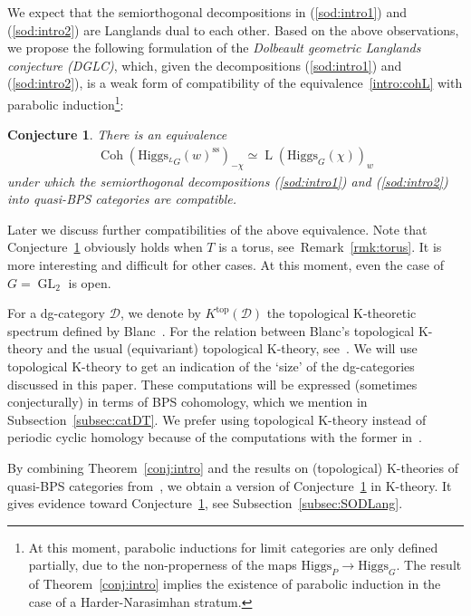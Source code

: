 \documentclass [11pt,oneside,a4paper,mathscr]{amsart}
\newtheorem{conj}[thm]{Conjecture}
\theoremstyle{definition}
\newcommand{\LL}{\operatorname{L}}
\newcommand{\Coh}{\operatorname{Coh}}
\newcommand{\GL}{\operatorname{GL}}
\newcommand{\Hig}{\mathrm{Higgs}}
\begin{document}
We expect that the semiorthogonal decompositions in (\ref{sod:intro1})
and (\ref{sod:intro2}) are Langlands dual to each other. 
Based on the above observations, we propose the following formulation of the \textit{Dolbeault geometric Langlands conjecture (DGLC)}, which, given the decompositions (\ref{sod:intro1}) and (\ref{sod:intro2}), is a weak form of compatibility of the equivalence~\eqref{intro:cohL} with parabolic induction\footnote{At this moment, parabolic inductions for limit categories are only defined partially, due to the non-properness of the maps $\Hig_P \to \Hig_G$. The result of Theorem~\ref{conj:intro} implies the existence of parabolic induction in the case of a Harder-Narasimhan stratum.}: 
\begin{conj}\label{conj:Higgs}
There is an equivalence 
\begin{align}\label{intro:eq:CohL}
    \Coh(\Hig_{^{L}G}(w)^{\mathrm{ss}})_{-\chi} \simeq \LL(\Hig_{G}(\chi))_{w}
\end{align}
under which the semiorthogonal decompositions (\ref{sod:intro1}) and (\ref{sod:intro2}) into quasi-BPS categories are 
compatible.
\end{conj}

 


Later we discuss further compatibilities of the above equivalence. 
Note that Conjecture~\ref{conj:Higgs} obviously holds when $T$ is a torus, see~Remark~\ref{rmk:torus}. It is more interesting and difficult for other cases. 
At this moment, even the case of $G=\GL_2$ is open. 

\medskip

For a dg-category $\mathscr{D}$, we denote by $K^{\text{top}}(\mathscr{D})$ the topological K-theoretic spectrum defined by Blanc~\cite{Blanc}. For the relation between Blanc's topological K-theory and the usual (equivariant) topological K-theory, see~\cite{Blanc, HLP}.
We will use topological K-theory to get an indication of the `size' of the dg-categories discussed in this paper. These computations will be expressed (sometimes conjecturally) in terms of BPS cohomology, which we mention in Subsection~\ref{subsec:catDT}. We prefer using topological K-theory instead of periodic cyclic homology because of the computations with the former in~\cite{PTtop, PThiggs2}.

By combining Theorem~\ref{conj:intro} and the results on (topological) K-theories of quasi-BPS 
categories from~\cite{PThiggs2}, we obtain a version of Conjecture~\ref{conj:Higgs} 
in K-theory. It gives evidence toward Conjecture~\ref{conj:Higgs}, see 
Subsection~\ref{subsec:SODLang}.
\end{document}
